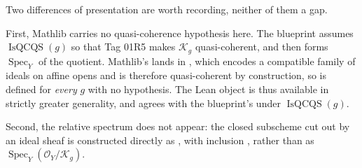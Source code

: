 \begin{definition}
  Two differences of presentation are worth recording, neither of them a gap.

  First, Mathlib carries no quasi-coherence hypothesis here.  The blueprint assumes
  $\operatorname{IsQCQS}(g)$ so that Tag 01R5 makes $\mathcal K_g$ quasi-coherent, and then
  forms $\operatorname{Spec}_Y$ of the quotient.  Mathlib's
  \texttt{} lands in
  \texttt{}, which encodes a compatible family of ideals on
  affine opens and is therefore quasi-coherent by construction, so
  \texttt{} is defined for \emph{every} $g$ with no
  hypothesis.  The Lean object is thus available in strictly greater generality, and agrees
  with the blueprint's under $\operatorname{IsQCQS}(g)$.

  Second, the relative spectrum does not appear: the closed subscheme cut out by an ideal
  sheaf is constructed directly as
  \texttt{}, with inclusion
  \texttt{}, rather than as
  $\operatorname{Spec}_Y(\mathcal O_Y/\mathcal K_g)$.
\end{definition}


